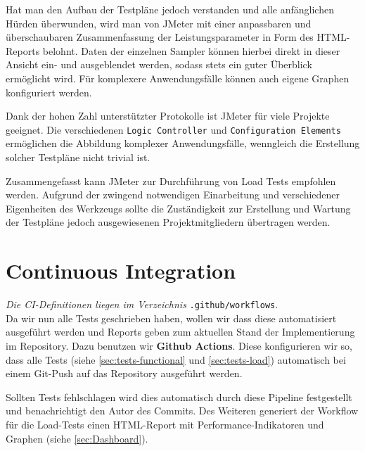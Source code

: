 Hat man den Aufbau der Testpläne jedoch verstanden und alle anfänglichen Hürden überwunden,
wird man von JMeter mit einer anpassbaren und überschaubaren Zusammenfassung der Leistungsparameter
in Form des HTML-Reports belohnt.
Daten der einzelnen Sampler können hierbei direkt in dieser Ansicht ein- und ausgeblendet werden,
sodass stets ein guter Überblick ermöglicht wird.
Für komplexere Anwendungsfälle können auch eigene Graphen konfiguriert werden.

Dank der hohen Zahl unterstützter Protokolle ist JMeter für viele Projekte geeignet.
Die verschiedenen \texttt{Logic Controller}  und \texttt{Configuration Elements} 
ermöglichen die Abbildung komplexer Anwendungsfälle,
wenngleich die Erstellung solcher Testpläne nicht trivial ist.

Zusammengefasst kann JMeter zur Durchführung von Load Tests empfohlen werden.
Aufgrund der zwingend notwendigen Einarbeitung und verschiedener Eigenheiten des Werkzeugs 
sollte die Zuständigkeit zur Erstellung und Wartung der Testpläne jedoch
ausgewiesenen Projektmitgliedern übertragen werden.

\section{Continuous Integration}\label{sec:CI}

\textit{Die \ac{CI}-Definitionen liegen im Verzeichnis} \texttt{.github/workflows}.\\

Da wir nun alle Tests geschrieben haben, wollen wir dass diese automatisiert ausgeführt werden und Reports geben zum aktuellen Stand der Implementierung im Repository. Dazu benutzen wir \textbf{Github Actions}. Diese konfigurieren wir so, dass alle Tests (siehe \ref{sec:tests-functional} und \ref{sec:tests-load}) automatisch bei einem Git-Push auf das Repository ausgeführt werden.

Sollten Tests fehlschlagen wird dies automatisch durch diese Pipeline festgestellt und benachrichtigt den Autor des Commits.
Des Weiteren generiert der Workflow für die Load-Tests einen HTML-Report mit Performance-Indikatoren und Graphen (siehe \ref{sec:Dashboard}).
